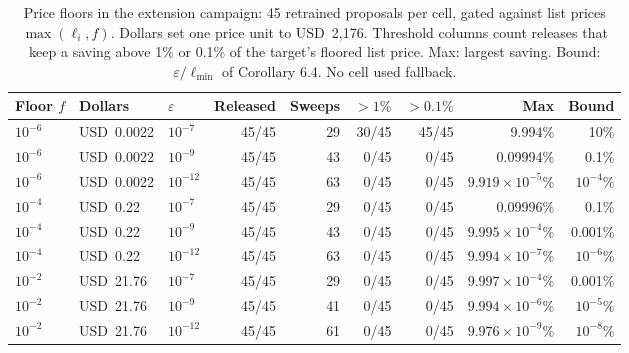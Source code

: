 \begin{table}[h]
\centering
\caption{Price floors in the extension campaign: 45 retrained proposals per cell, gated against list prices $\max(\ell_i, f)$. Dollars set one price unit to USD~2{,}176. Threshold columns count releases that keep a saving above 1\% or 0.1\% of the target's floored list price. Max: largest saving. Bound: $\varepsilon / \ell_{\min}$ of Corollary 6.4. No cell used fallback.}
\label{tab:ext-floors}
\footnotesize
\setlength{\tabcolsep}{3.5pt}
\begin{tabular}{@{}lllrrrrrr@{}}
\toprule
Floor $f$ & Dollars & $\varepsilon$ & Released & Sweeps & ${>}1\%$ & ${>}0.1\%$ & Max & Bound \\
\midrule
$10^{-6}$ & USD~0.0022 & $10^{-7}$ & 45/45 & 29 & 30/45 & 45/45 & 9.994\% & 10\% \\
$10^{-6}$ & USD~0.0022 & $10^{-9}$ & 45/45 & 43 & 0/45 & 0/45 & 0.09994\% & 0.1\% \\
$10^{-6}$ & USD~0.0022 & $10^{-12}$ & 45/45 & 63 & 0/45 & 0/45 & $9.919 \times 10^{-5}$\% & $10^{-4}$\% \\
$10^{-4}$ & USD~0.22 & $10^{-7}$ & 45/45 & 29 & 0/45 & 0/45 & 0.09996\% & 0.1\% \\
$10^{-4}$ & USD~0.22 & $10^{-9}$ & 45/45 & 43 & 0/45 & 0/45 & $9.995 \times 10^{-4}$\% & 0.001\% \\
$10^{-4}$ & USD~0.22 & $10^{-12}$ & 45/45 & 63 & 0/45 & 0/45 & $9.994 \times 10^{-7}$\% & $10^{-6}$\% \\
$10^{-2}$ & USD~21.76 & $10^{-7}$ & 45/45 & 29 & 0/45 & 0/45 & $9.997 \times 10^{-4}$\% & 0.001\% \\
$10^{-2}$ & USD~21.76 & $10^{-9}$ & 45/45 & 41 & 0/45 & 0/45 & $9.994 \times 10^{-6}$\% & $10^{-5}$\% \\
$10^{-2}$ & USD~21.76 & $10^{-12}$ & 45/45 & 61 & 0/45 & 0/45 & $9.976 \times 10^{-9}$\% & $10^{-8}$\% \\
\bottomrule
\end{tabular}
\end{table}
